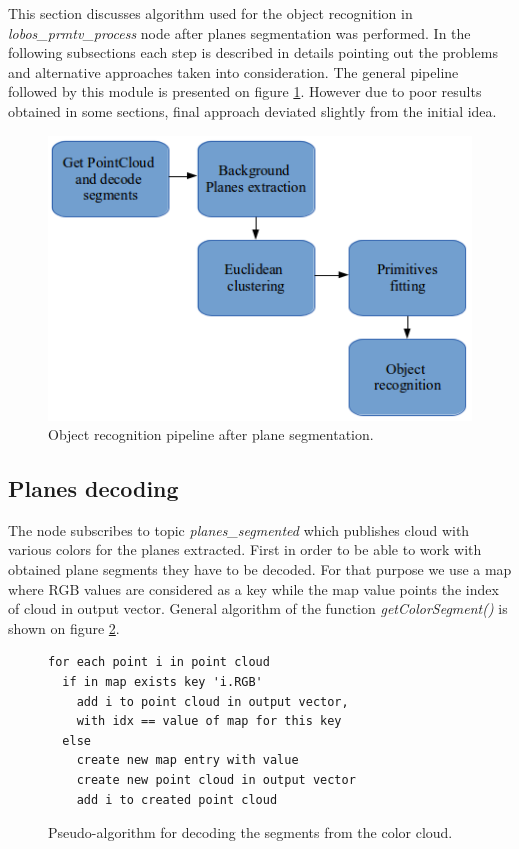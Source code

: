 \documentclass[fontsize=12pt]{article}
\begin{document}
This section discusses algorithm used for the object recognition in \emph{lobos\_prmtv\_process} node after planes segmentation was performed. In the following subsections each step is described in details pointing out the problems and alternative approaches taken into consideration. The general pipeline followed by this module is presented on figure \ref{fig:pipeline}. However due to poor results obtained in some sections, final approach deviated slightly from the initial idea.


\begin{figure}
  \includegraphics[scale=0.7]{images/pipeline}
  \caption{Object recognition pipeline after plane segmentation.}
  \label{fig:pipeline}
\end{figure}
\subsection{Planes decoding}
The node subscribes to topic \emph{planes\_segmented} which publishes cloud with various colors for the planes extracted. First in order to be able to work with obtained plane segments they have to be decoded. For that purpose we use a map where RGB values are considered as a key while the map value points the index of cloud in output vector. General algorithm of the function \emph{getColorSegment()} is shown on figure \ref{code:algo}.

\begin{figure}[H]
\begin{lstlisting}
for each point i in point cloud
  if in map exists key 'i.RGB'
    add i to point cloud in output vector,
    with idx == value of map for this key
  else
    create new map entry with value
    create new point cloud in output vector
    add i to created point cloud
\end{lstlisting}
\caption{Pseudo-algorithm for decoding the segments from the color cloud.}
\label{code:algo}
\end{figure}
\end{document}
